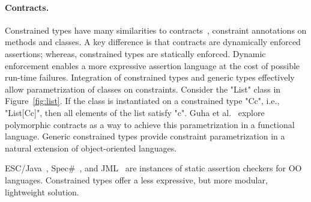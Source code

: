 
\paragraph{Contracts.}

Constrained types have many similarities to
contracts~\cite{Parnas72,eiffel,Findler02},
constraint annotations on methods and classes.
A key difference is that contracts are dynamically enforced
assertions; whereas, constrained types are statically enforced.
Dynamic enforcement enables a more expressive assertion language
at the cost of possible run-time failures.
Integration of constrained types and generic types
effectively allow parametrization of classes on constraints.
Consider the \xcd"List" class in Figure~\ref{fig:list}.
If the class is instantiated on a constrained type \xcd"C{c}",
i.e., \xcd"List[C{c}]",
then all elements of the list satisfy \xcd"c".
Guha et al.~\cite{GMFK07} 
explore polymorphic contracts as a way to achieve this
parametrization in a functional language.
Generic constrained types provide constraint parametrization
in a natural extension of object-oriented languages.

ESC/Java~\cite{escjava-pldi02}, Spec\#~\cite{specsharp}, and
JML~\cite{leavens00jml} are instances of
static assertion checkers for OO languages.  Constrained types
offer a less expressive, but more modular, lightweight solution.

